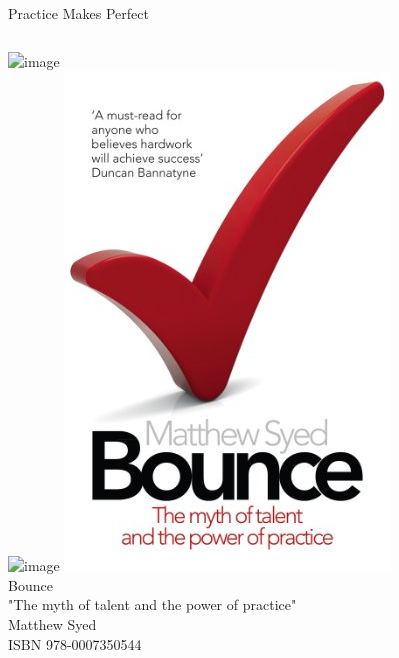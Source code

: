
\begin{frame}{\large Practice Makes Perfect}
    \begin{columns}
            \includegraphics<+->[scale=0.25]{images/scouts}\\[2em]
            \includegraphics<+->[scale=0.5]{images/ukpa}
        \column<+->{0.5\textwidth}
            \includegraphics[scale=0.2]{images/bounce}\\
            Bounce\\
            "The myth of talent and the power of practice"\\[2em]

            Matthew Syed\\
            ISBN 978-0007350544\\
    \end{columns}
\end{frame}
